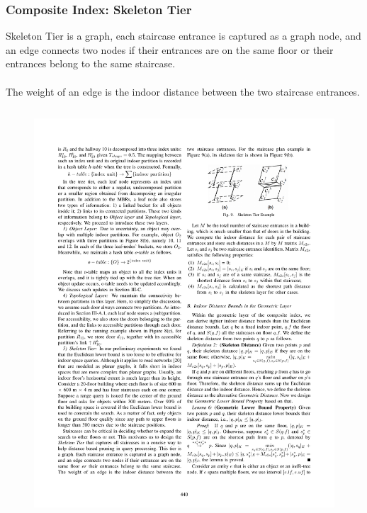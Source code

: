 \begin{frame}
\frametitle{Composite Index: Skeleton Tier}

Skeleton Tier is a graph, each staircase entrance is captured as a graph node, and an edge connects two nodes if their entrances are on the same floor or their entrances belong to the same staircase.\\~\\

The weight of an edge is the indoor distance between the two staircase entrances.

\vspace{-10pt}
\begin{columns}[c]

  \begin{figure}[tb]
    \includegraphics[width=\columnwidth]{figures/2-6/2-6-11.pdf}
  \end{figure}


\end{columns}
\end{frame}
